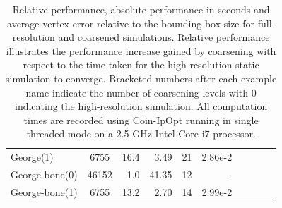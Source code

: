 \begin{table}[!h]
\begin{tabular}{l c r r r r r r r r}
		{\color{DDFEMColor}George(1)} &6755 & 16.4&3.49&21&2.86e-2\\
		{\color{HiResColor}George-bone(0)} &46152 & 1.0&41.35&12&-\\
		{\color{DDFEMColor}George-bone(1)} &6755 & 13.2&2.70&14&2.99e-2\\
		\hline
	\end{tabular}
	\vspace{-4pt}
	\caption{Relative performance, absolute performance in seconds and average vertex error relative to the bounding box size for full-resolution and coarsened simulations.
		Relative performance illustrates the performance increase gained by coarsening with respect to the time taken for the high-resolution static simulation to converge. Bracketed numbers after each example name indicate the number of coarsening levels with 0 indicating the {\color{HiResColor}high-resolution} simulation. All computation times are recorded using Coin-IpOpt running in single threaded mode on a 2.5 GHz Intel Core i7 processor. }
	\label{table:performance}
\end{table}
